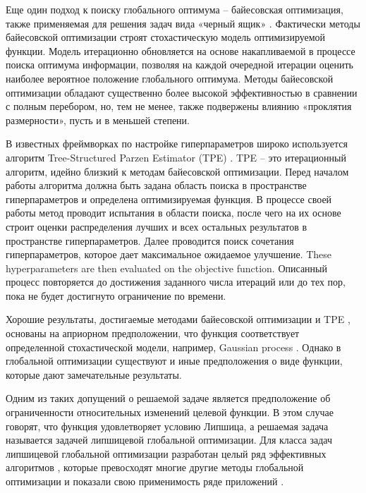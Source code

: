 \documentclass[preprint,12pt]{elsarticle}
\begin{document}
Еще один подход к поиску глобального оптимума -- байесовская оптимизация, также применяемая для решения задач вида «черный ящик» \cite{Frazier2018,Archetti2019}. Фактически методы байесовской оптимизации строят стохастическую модель оптимизируемой функции. Модель итерационно обновляется на основе накапливаемой в процессе поиска оптимума информации, позволяя на каждой очередной итерации оценить наиболее вероятное положение глобального оптимума. Методы байесовской оптимизации обладают существенно более высокой эффективностью в сравнении с полным перебором, но, тем не менее, также подвержены влиянию «проклятия размерности», пусть и в меньшей степени.

В известных фреймворках по настройке гиперпараметров широко используется алгоритм Tree-Structured Parzen Estimator (TPE) \cite{hyperopt,NIPS2011}. TPE -- это итерационный алгоритм, идейно близкий к методам байесовской оптимизации. Перед началом работы алгоритма должна быть задана область поиска в пространстве гиперпараметров и определена оптимизируемая функция. В процессе своей работы метод проводит испытания в области поиска, после чего на их основе строит оценки распределения лучших и всех остальных результатов в пространстве гиперпараметров. Далее проводится поиск сочетания гиперпараметров, которое дает максимальное ожидаемое улучшение. These hyperparameters are then evaluated on the objective function. Описанный процесс повторяется до достижения заданного числа итераций или до тех пор, пока не будет достигнуто ограничение по времени.

Хорошие результаты, достигаемые методами байесовской оптимизации  \cite{Joy2020} и TPE \cite{Watanabe2022a,Watanabe2022b}, основаны на априорном предположении, что функция соответствует определенной стохастической модели, например, Gaussian process \cite{Rasmussen2005}. Однако в глобальной оптимизации существуют и иные предположения о виде функции, которые дают замечательные результаты.

Одним из таких допущений о решаемой задаче является предположение об ограниченности относительных изменений целевой функции. В этом случае говорят, что функция удовлетворяет условию Липшица, а решаемая задача называется задачей липшицевой глобальной оптимизации. Для класса задач липшицевой глобальной оптимизации разработан целый ряд эффективных алгоритмов \cite{Jones2021,Paulavicius2020,Strongin2020,Sergeyev2017,PaulaviciusZilinskas2014}, которые превосходят многие другие методы глобальной оптимизации \cite{Sergeyev2018} и показали свою применимость ряде приложений \cite{Kvasov2008,CANDELIERI2019,Gubaydullin2021}.
 
\end{document}
